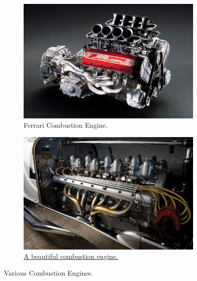 \documentclass[10pt,xcolor=table,english]{beamer}   %
\begin{document}
\begin{frame}
\begin{figure}
        \begin{subfigure}{.49\textwidth}
            \centering
            \includegraphics[width=.8\linewidth]{Ferrari_355_Engine}  
            \caption{Ferrari Combustion Engine.}
            \label{fig:sub-fourth}
        \end{subfigure}
        \begin{subfigure}{.49\textwidth}
            \centering
            \includegraphics[width=.8\linewidth]{Combustion_Engines_1}  
            \caption{\href{https://www.pinterest.es/pin/816136763692046539/}{A beautiful combustion engine.}}
            \label{fig:sub-second}
        \end{subfigure}  
        \caption{Various Combustion Engines.}
        \label{fig:fig}
    \end{figure}
\end{frame}
\end{document}
